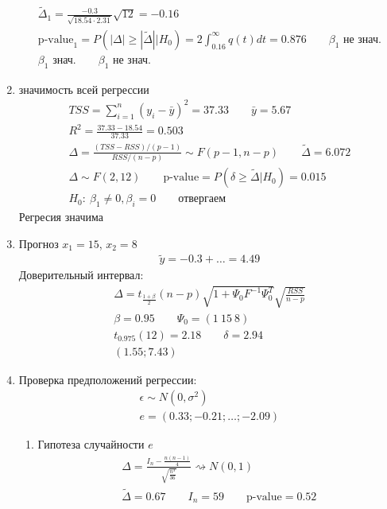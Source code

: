\documentclass{article}
\begin{document}
\begin{eg}
\begin{enumerate}
\begin{gather*}
      \tilde{\Delta}_1 = \frac{-0.3}{\sqrt{18.54 \cdot 2.31}} \sqrt{12} = -0.16 \\ 
      \text{p-value}_1=P(|\Delta| \ge |\tilde{\Delta}| | H_0) = 2\int_{0.16}^{\infty}q(t)dt = 0.876 \qquad \beta_1 \text{ не знач.}\\
      \beta_1 \text{ знач.}  \qquad \beta_1 \text{ не знач.} 
    \end{gather*}
  \item значимость всей регрессии
    \begin{gather*}
      TSS= \sum_{i=1}^{n}(y_i-\bar{y})^{2}=37.33 \qquad \bar{y}=5.67 \\ 
      R^{2}= \frac{37.33-18.54}{37.33} = 0.503 \\ 
      \Delta = \frac{(TSS-RSS)/(p-1)}{RSS/(n-p)} \sim F(p-1, n-p) \qquad \tilde{\Delta} = 6.072 \\ 
      \Delta \sim F(2,12) \qquad \text{p-value} = P(\delta \ge \tilde{\Delta} |H_0) = 0.015 \\ 
      H_0: \: \beta_1 \neq 0, \beta_i=0 \qquad \text{отвергаем} 
    \end{gather*}
    Регресия значима
  \item Прогноз $x_1=15$, $x_2 = 8$
    \begin{gather*}
      \tilde{y} = -0.3 + \dots = 4.49
    \end{gather*}
    Доверительный интервал:
    \begin{gather*}
      \Delta = t_{\frac{1+\beta}{2}}(n-p)\sqrt{1+\Psi_0 F^{-1}\Psi_0^{T}}\sqrt{\frac{RSS}{n-p}} \\ 
      \beta = 0.95 \qquad \Psi_0 = (1 \ 15 \ 8) \\ 
      t_{0.975}(12)=2.18 \qquad \delta = 2.94 \\ 
      (1.55; 7.43)
    \end{gather*}
  \item Проверка предположений регрессии: 
    \begin{gather*}
      \epsilon \sim N(0,\sigma^{2}) \\ 
      e = (0.33; -0.21;\dots ;-2.09) 
    \end{gather*}
    \begin{enumerate}
      \item Гипотеза случайности $e$ 
        \begin{gather*}
          \Delta = \frac{I_n - \frac{n(n-1)}{4}}{\sqrt{\frac{n^{3}}{36}}} \rightsquigarrow N(0,1) \\ 
          \tilde{\Delta}=0.67 \qquad I_n = 59 \qquad \text{p-value}=0.52

\end{gather*}
\end{enumerate}
\end{enumerate}
\end{eg}
\end{document}
